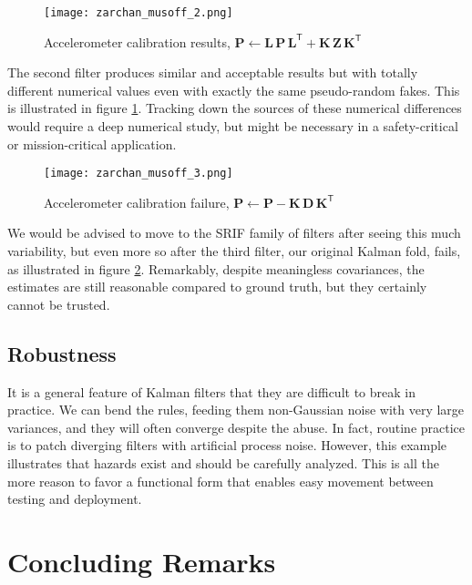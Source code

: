 \documentclass[10pt,oneside,x11names]{article}
\begin{document}
\begin{figure}[htb]
\centering
\texttt{[image: zarchan\_musoff\_2.png]}
\caption{\label{fig:orgparagraph4}
Accelerometer calibration results, \(\mathbold{P} \leftarrow\mathbold{L}\,\mathbold{P}\,\mathbold{L}^{\mathsf{T}} +\mathbold{K}\,\mathbold{Z}\,\mathbold{K}^{\mathsf{T}}\)}
\end{figure}

The second filter produces similar and acceptable results but with totally
different numerical values even with exactly the same pseudo-random fakes. This
is illustrated in figure \ref{fig:orgparagraph4}. Tracking down the sources of
these numerical differences would require a deep numerical study, but might
be necessary in a safety-critical or mission-critical application.

\begin{figure}[htb]
\centering
\texttt{[image: zarchan\_musoff\_3.png]}
\caption{\label{fig:orgparagraph5}
Accelerometer calibration failure, \(\mathbold{P}\leftarrow\mathbold{P} -\mathbold{K}\,\mathbold{D}\,\mathbold{K}^{\mathsf{T}}\)}
\end{figure}

We would be advised to move to the SRIF family of filters after seeing this much
variability, but even more so after the third filter, our original Kalman fold,
fails, as illustrated in figure \ref{fig:orgparagraph5}. Remarkably, despite
meaningless covariances, the estimates are still reasonable compared to ground
truth, but they certainly cannot be trusted.

\subsection{Robustness}
\label{sec:orgheadline25}

It is a general feature of Kalman filters that they are difficult to break in
practice. We can bend the rules, feeding them non-Gaussian noise with very large
variances, and they will often converge despite the abuse. In fact, routine
practice is to patch diverging filters with artificial process noise.
However, this example illustrates that hazards exist and should be carefully
analyzed. This is all the more reason to favor a functional form that enables
easy movement between testing and deployment.

\section{Concluding Remarks}
\label{sec:orgheadline27}
\end{document}
